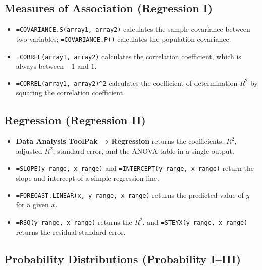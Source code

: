 \documentclass[
  11pt,
  letterpaper,
  DIV=11,
  numbers=noendperiod,
  oneside,
  open=any]{scrreprt}
\begin{document}
\subsection*{Measures of Association (Regression
I)}\label{measures-of-association-regression-i}

\begin{itemize}
\item
  \texttt{=COVARIANCE.S(array1,\ array2)} calculates the sample
  covariance between two variables; \texttt{=COVARIANCE.P()} calculates
  the population covariance.
\item
  \texttt{=CORREL(array1,\ array2)} calculates the correlation
  coefficient, which is always between \(-1\) and \(1\).
\item
  \texttt{=CORREL(array1,\ array2)\^{}2} calculates the coefficient of
  determination \(R^2\) by squaring the correlation coefficient.
\end{itemize}

\subsection*{Regression (Regression II)}\label{regression-regression-ii}

\begin{itemize}
\item
  \textbf{Data Analysis ToolPak → Regression} returns the coefficients,
  \(R^2\), adjusted \(R^2\), standard error, and the ANOVA table in a
  single output.
\item
  \texttt{=SLOPE(y\_range,\ x\_range)} and
  \texttt{=INTERCEPT(y\_range,\ x\_range)} return the slope and
  intercept of a simple regression line.
\item
  \texttt{=FORECAST.LINEAR(x,\ y\_range,\ x\_range)} returns the
  predicted value of \(y\) for a given \(x\).
\item
  \texttt{=RSQ(y\_range,\ x\_range)} returns the \(R^2\), and
  \texttt{=STEYX(y\_range,\ x\_range)} returns the residual standard
  error.
\end{itemize}

\subsection*{Probability Distributions (Probability
I--III)}\label{probability-distributions-probability-iiii}
\end{document}
